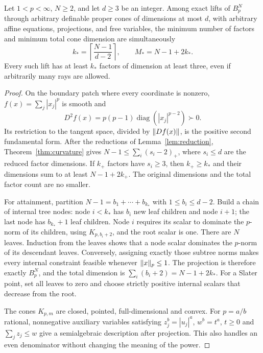 \begin{theorem}\label{thm:lp-granularity}
Let $1<p<\infty$, $N\geq2$, and let $d\geq3$ be an integer.
Among exact lifts of $B_p^N$
through arbitrary definable proper cones of dimensions at most $d$, with
arbitrary affine equations, projections, and free variables, the minimum
number of factors and minimum total cone dimension are simultaneously
\begin{equation}\label{eq:lp-generic-frontier}
 k_* = \left\lceil\frac{N-1}{d-2}\right\rceil,
 \qquad M_* = N-1+2k_*.
\end{equation}
Every such lift has at least $k_*$ factors of dimension at least three,
even if arbitrarily many rays are allowed.
\end{theorem}
\begin{proof}
On the boundary patch where every coordinate is nonzero,
$f(x)=\sum_j|x_j|^p$ is smooth and
\[
 D^2 f(x)=p(p-1)\operatorname{diag}(|x_j|^{p-2})\succ0.
\]
Its restriction to the tangent space, divided by $\lVert Df(x)\rVert$, is
the positive second fundamental form. After the reductions of
Lemma~\ref{lem:reduction}, Theorem~\ref{thm:curvature} gives
$N-1\leq\sum_i(s_i-2)_+$, where $s_i\leq d$ are the reduced factor
dimensions. If $k_+$ factors have $s_i\geq3$, then
$k_+\geq k_*$ and their dimensions sum to at least $N-1+2k_+$.
The original dimensions and the total factor count are no smaller.

For attainment, partition $N-1=b_1+\cdots+b_{k_*}$ with
$1\leq b_i\leq d-2$. Build a chain of internal tree nodes: node $i<k_*$
has $b_i$ new leaf children and node $i+1$; the last node has $b_{k_*}+1$
leaf children. Node $i$ requires its scalar to dominate the $p$-norm of
its children, using $K_{p,b_i+2}$, and the root scalar is one. There are
$N$ leaves. Induction from the leaves shows that a node scalar dominates
the $p$-norm of its descendant leaves. Conversely, assigning exactly
those subtree norms makes every internal constraint feasible whenever
$\lVert x\rVert_p\leq1$. The projection is therefore exactly $B_p^N$, and
the total dimension is $\sum_i(b_i+2)=N-1+2k_*$. For a Slater point,
set all leaves to zero and choose strictly positive internal scalars
that decrease from the root.

The cones $K_{p,m}$ are closed, pointed, full-dimensional and convex.
For $p=a/b$ rational, nonnegative auxiliary variables satisfying
$z_j^b=|u_j|^a$, $w^b=t^a$, $t\geq0$ and $\sum_j z_j\leq w$
give a semialgebraic description after projection. This also handles an
even denominator without changing the meaning of the power.
\end{proof}

